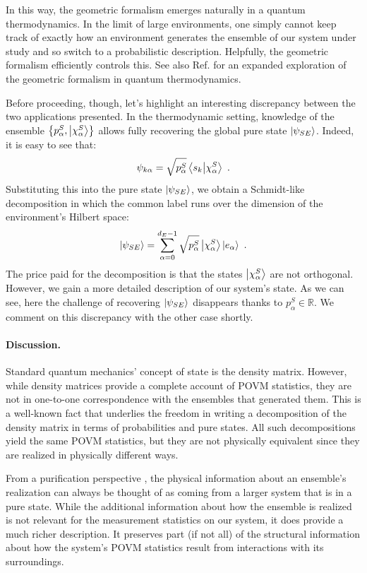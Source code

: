 \documentclass[nofootinbib,pre,twocolumn,showpacs,showkeys,groupaddress,preprintnumbers,floatfix]{revtex4-1}
\newcommand{\1}{\mathbbm{1}}
\begin{document}
In this way, the geometric formalism emerges naturally in a quantum
thermodynamics. In the limit of large environments, one simply cannot keep
track of exactly how an environment generates the ensemble of our system under
study and so switch to a probabilistic description. Helpfully, the geometric
formalism efficiently controls this. See also Ref. \cite{Anza20b} for an
expanded exploration of the geometric formalism in quantum thermodynamics.

Before proceeding, though, let's highlight an interesting discrepancy between
the two applications presented. In the thermodynamic setting, knowledge of the
ensemble $\left\{ p_\alpha^S, \ket{\chi_\alpha^S}\right\}$ allows fully
recovering the global pure state $\ket{\psi_{SE}}$. Indeed, it is easy to see
that:
\begin{align*}
\psi_{k\alpha} = \sqrt{p_\alpha^S} \braket{s_k}{\chi_\alpha^S}
  ~.
\end{align*}
Substituting this into the pure state $\ket{\psi_{SE}}$, we obtain a Schmidt-like
decomposition in which the common label runs over the dimension of the 
environment's Hilbert space:
\begin{align*}
\ket{\psi_{SE}} = \sum_{\alpha=0}^{d_E-1}
  \sqrt{p_\alpha^S} \ket{\chi_\alpha^S}\ket{e_\alpha}
  ~.
\end{align*}
The price paid for the decomposition is that the states $\ket{\chi_\alpha^S}$
are not orthogonal. However, we gain a more detailed description of our
system's state. As we can see, here the challenge of recovering
$\ket{\psi_{SE}}$ disappears thanks to $p_\alpha^S \in \mathbb{R}$. We comment
on this discrepancy with the other case shortly.

\paragraph*{Discussion.}
Standard quantum mechanics' concept of state is the density matrix. However,
while density matrices provide a complete account of POVM statistics, they are
not in one-to-one correspondence with the ensembles that generated them. This
is a well-known fact that underlies the freedom in writing a decomposition of
the density matrix in terms of probabilities and pure states.  All such
decompositions yield the same POVM statistics, but they are not physically
equivalent since they are realized in physically different ways.

From a purification perspective \cite{Wilde2017}, the physical information
about an ensemble's realization can always be thought of as coming from a
larger system that is in a pure state. While the additional information about
how the ensemble is realized is not relevant for the measurement statistics on
our system, it does provide a much richer description. It preserves part (if not all) 
of the structural information about how the system's POVM statistics result from
interactions with its surroundings.
 
\end{document}
